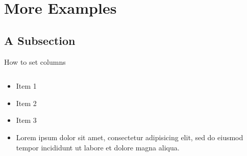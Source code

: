 \documentclass[10pt, aspectratio=1610]{beamer}
\begin{document}
\section{More Examples}
\subsection{A Subsection}

\begin{frame}{How to set columns}
	\begin{columns}[T]
		\begin{column}{.40\textwidth}
			\begin{itemize}
				\item Item 1
				\item Item 2
				\item Item 3
				\item Lorem ipsum dolor sit amet, consectetur adipisicing elit, sed do eiusmod tempor incididunt ut labore et dolore magna aliqua. 
			\end{itemize}
		\end{column}
		\begin{column}{.40\textwidth}

\end{column}
\end{columns}
\end{frame}
\end{document}
